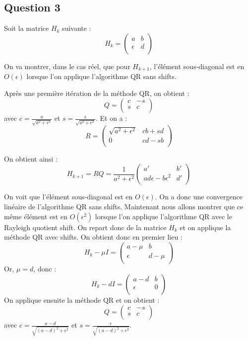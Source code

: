 \documentclass[11pt]{article}
\begin{document}
\subsection{Question 3}
Soit la matrice $H_k$ suivante : 
$$H_k = \begin{pmatrix}
    a & b \\
    \epsilon & d \\
\end{pmatrix}$$

On va montrer, dans le cas réel, que pour $H_{k+1}$, l'élément sous-diagonal est en $O(\epsilon)$ lorsque l'on applique l'algorithme QR sans shifts.

Après une première itération de la méthode QR, on obtient :
$$Q = \begin{pmatrix}
    c & -s \\
    s & c \\
\end{pmatrix}$$
avec $c = \frac{a}{\sqrt{a^2 + \epsilon^2}}$ et $s = \frac{\epsilon}{\sqrt{a^2 + \epsilon^2}}$.
Et on a :
$$R = \begin{pmatrix}
    \sqrt{a^2 + \epsilon^2} & c b + s d \\
    0 & c d - s b \\
\end{pmatrix}$$

On obtient ainsi :
$$H_{k+1} = RQ = \frac{1}{a^2+\epsilon^2} \begin{pmatrix}
    a' & b' \\
    a d \epsilon - b \epsilon^2 & d' \\
\end{pmatrix}$$

On voit que l'élément sous-diagonal est en $O(\epsilon)$. On a donc une convergence linéaire de l'algorithme QR sans shifts.
\newline
Maintenant nous allons montrer que ce même élément est en $O(\epsilon^2)$ lorsque l'on applique l'algorithme QR avec le Rayleigh quotient shift.
On repart donc de la matrice $H_k$ et on applique la méthode QR avec shifts. On obtient donc en premier lieu :
$$H_k - \mu I = \begin{pmatrix}
    a - \mu & b \\
    \epsilon & d - \mu \\
\end{pmatrix}$$
Or, $\mu = d$, donc :
$$H_k - d I = \begin{pmatrix}
    a - d & b \\
    \epsilon & 0 \\
\end{pmatrix}$$
On applique ensuite la méthode QR et on obtient :
$$Q = \begin{pmatrix}
    c & -s \\
    s & c \\
\end{pmatrix}$$
avec $c = \frac{a - d}{\sqrt{(a - d)^2 + \epsilon^2}}$ et $s = \frac{\epsilon}{\sqrt{(a - d)^2 + \epsilon^2}}$.
\end{document}
